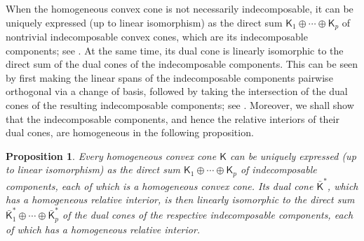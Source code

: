 \documentclass[oneside]{amsart}
\theoremstyle{plain}
\newtheorem{proposition}[theorem]{Proposition}
\theoremstyle{definition}
\theoremstyle{remark}
\numberwithin{equation}{section}
\begin{document}
When the homogeneous convex cone is not necessarily indecomposable, it can
be uniquely expressed (up to linear isomorphism) as the direct sum
$\mathsf{K}_{1} \oplus \dotsb \oplus \mathsf{K}_{p}$ of nontrivial
indecomposable convex cones, which are its indecomposable components; see
\cite[\S4]{Hor78}. At the same time, its dual cone is linearly isomorphic
to the direct sum of the dual cones of the indecomposable components. This
can be seen by first making the linear spans of the indecomposable
components pairwise orthogonal via a change of basis, followed by taking
the intersection of the dual cones of the resulting indecomposable
components; see \cite[Corollary~16.4.2]{Rock97}. Moreover, we shall show
that the indecomposable components, and hence the relative interiors of
their dual cones, are homogeneous in the following proposition.
\begin{proposition}
Every homogeneous convex cone $\mathsf{K}$ can be uniquely expressed (up to
linear isomorphism) as the direct sum $\mathsf{K}_{1} \oplus \dotsb \oplus
\mathsf{K}_{p}$ of indecomposable components, each of which is a
homogeneous convex cone. Its dual cone $\bar{\mathsf{K}}^{*}$, which has a
homogeneous relative interior, is then linearly isomorphic to the direct
sum $\bar{\mathsf{K}}_{1}^{*} \oplus \dotsb \oplus
\bar{\mathsf{K}}_{p}^{*}$ of the dual cones of the respective
indecomposable components, each of which has a homogeneous relative
interior.
\end{proposition}
\end{document}
